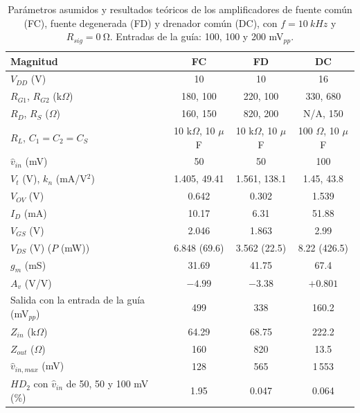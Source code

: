 \documentclass[conference]{IEEEtran}
\newcommand{\gm}{g_m}
\newcommand{\kn}{k_n}
\newcommand{\Vov}{V_{OV}}
\newcommand{\Rsig}{R_{sig}}
\begin{document}
\begin{table}[htbp]
\centering
\caption{Parámetros asumidos y resultados teóricos de los amplificadores de fuente común (FC), fuente degenerada (FD) y drenador común (DC), con $f=\SI{10}{kHz}$ y $\Rsig=\SI{0}{\ohm}$. Entradas de la guía: 100, 100 y 200 mV$_{pp}$.}
\label{tab:param}
\scriptsize
\renewcommand{\arraystretch}{1.03}
\setlength{\tabcolsep}{3pt}
\begin{tabular}{@{}lccc@{}}
\toprule
Magnitud & FC & FD & DC \\
\midrule
$V_{DD}$ (V) & 10 & 10 & 16 \\
$R_{G1}$, $R_{G2}$ (k$\Omega$) & 180, 100 & 220, 100 & 330, 680 \\
$R_D$, $R_S$ ($\Omega$) & 160, 150 & 820, 200 & N/A, 150 \\
$R_L$, $C_1=C_2=C_S$ & 10 k$\Omega$, 10 $\mu$F & 10 k$\Omega$, 10 $\mu$F & 100 $\Omega$, 10 $\mu$F \\
$\hat v_{in}$ (mV) & 50 & 50 & 100 \\
$V_t$ (V), $\kn$ (mA/V$^2$) & 1.405, 49.41 & 1.561, 138.1 & 1.45, 43.8 \\
\midrule
$\Vov$ (V) & 0.642 & 0.302 & 1.539 \\
$I_D$ (mA) & 10.17 & 6.31 & 51.88 \\
$V_{GS}$ (V) & 2.046 & 1.863 & 2.99 \\
$V_{DS}$ (V) ($P$ (mW)) & 6.848 (69.6) & 3.562 (22.5) & 8.22 (426.5) \\
$\gm$ (mS) & 31.69 & 41.75 & 67.4 \\
$A_v$ (V/V) & $-4.99$ & $-3.38$ & $+0.801$ \\
Salida con la entrada de la guía (mV$_{pp}$) & 499 & 338 & 160.2 \\
$Z_{in}$ (k$\Omega$) & 64.29 & 68.75 & 222.2 \\
$Z_{out}$ ($\Omega$) & 160 & 820 & 13.5 \\
$\hat v_{in,max}$ (mV) & 128 & 565 & 1\,553 \\
$HD_2$ con $\hat v_{in}$ de 50, 50 y 100 mV (\%) & 1.95 & 0.047 & 0.064 \\
\bottomrule
\end{tabular}
\end{table}
\end{document}
